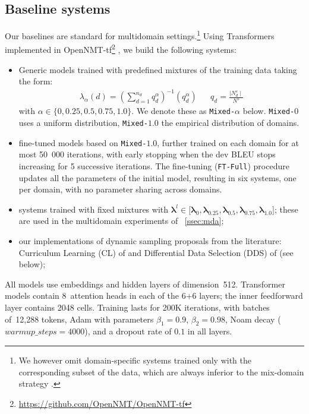 \documentclass[11pt]{article}
\newcommand{\fyDone}[1]{\done[FY]\Todo[FY:]{\textcolor{orange}{#1}}}
\newcommand{\system}[1]{\texttt{{#1}}}
\newcommand{\vlambda}{\ensuremath{\boldsymbol\lambda}\xspace} %
\begin{document}
\subsection{Baseline systems \label{ssec:baseline}}
Our baselines are standard for multidomain settings.\footnote{We however omit domain-specific systems trained only with the corresponding subset of the data, which are always inferior to the mix-domain strategy \cite{Britz17mixing}.} Using Transformers \cite{Vaswani17attention} implemented in OpenNMT-tf\footnote{\url{https://github.com/OpenNMT/OpenNMT-tf}} \cite{Klein17opennmt}, we build the following systems:
\begin{itemize}
\itemsep0em 
\item Generic models trained with predefined mixtures of the training data taking the form:
\begin{align} \label{mixture:trn}
\lambda_{\alpha}(d) = (\sum_{d=1}^{n_d}q_d^{\alpha})^{-1} (q_d^{\alpha}) &&
q_d = \frac{\mid N^{s}_d \mid}{\displaystyle{N^{s}}} %
\end{align}
with $\alpha \in \{0,0.25,0.5,0.75,1.0\}$. We denote these as \system{Mixed-$\alpha$} below. \system{Mixed-$0$} uses a uniform distribution, \system{Mixed-$1.0$} the empirical distribution of domains.
\item fine-tuned models based on \system{Mixed-$1.0$}, further trained on each domain for at most 50~000 iterations, with early stopping when the dev BLEU stops increasing for 5 successive iterations.\fyDone{for ?? iterations} The fine-tuning (\system{FT-Full}) procedure updates all the parameters of the initial model, resulting in six systems, one per domain, with no parameter sharing across domains.
\item systems trained with fixed mixtures with $\vlambda^l \in \big[ \vlambda_0, \vlambda_{0.25}, \vlambda_{0.5}, \vlambda_{0.75}, \vlambda_{1.0}\big]$; these are used in the multidomain experiments of \textsection~\ref{ssec:mda};
\item  our implementations of dynamic sampling proposals from the literature: Curriculum Learning (CL) of  and Differential Data Selection (DDS) of  (see below);
\end{itemize}

All models use embeddings and hidden layers of dimension~512. Transformer models contain 8~attention heads in each of the 6+6 layers; the inner feedforward layer contains 2048 cells. Training lasts for 200K iterations, with batches of~12,288 tokens, Adam with parameters $\beta_1=0.9$, $\beta_2= 0.98$, Noam decay ($warmup\_steps=4000$), and a dropout rate of $0.1$ in all layers.
\end{document}
